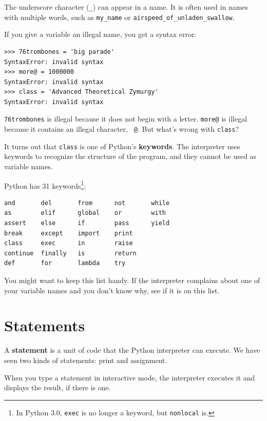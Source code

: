 \documentclass[10pt]{book}
\begin{document}
The underscore character (\verb"_") can appear in a name.
It is often used in names with multiple words, such as
\verb"my_name" or \verb"airspeed_of_unladen_swallow".


If you give a variable an illegal name, you get a syntax error:

\beforeverb
\begin{verbatim}
>>> 76trombones = 'big parade'
SyntaxError: invalid syntax
>>> more@ = 1000000
SyntaxError: invalid syntax
>>> class = 'Advanced Theoretical Zymurgy'
SyntaxError: invalid syntax
\end{verbatim}
\afterverb
%
{\tt 76trombones} is illegal because it does not begin with a letter.
{\tt more@} is illegal because it contains an illegal character, {\tt
@}.  But what's wrong with {\tt class}?

It turns out that {\tt class} is one of Python's {\bf keywords}.  The
interpreter uses keywords to recognize the structure of the program,
and they cannot be used as variable names.


Python has 31 keywords\footnote{In Python 3.0, {\tt exec} is no
longer a keyword, but {\tt nonlocal} is.}:

\beforeverb
\begin{verbatim}
and       del       from      not       while    
as        elif      global    or        with     
assert    else      if        pass      yield    
break     except    import    print              
class     exec      in        raise              
continue  finally   is        return             
def       for       lambda    try
\end{verbatim}
\afterverb
%
You might want to keep this list handy.  If the interpreter complains
about one of your variable names and you don't know why, see if it
is on this list.

\section{Statements}

A {\bf statement} is a unit of code that the Python interpreter can
execute.  We have seen two kinds of statements: print
and assignment.


When you type a statement in interactive mode, the interpreter
executes it and displays the result, if there is one.
\end{document}
